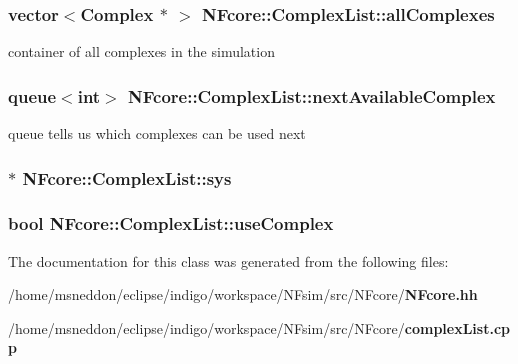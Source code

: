 \subsubsection{\setlength{\rightskip}{0pt plus 5cm}vector$<${\bf Complex} $\ast$ $>$ {\bf NFcore::ComplexList::allComplexes}\hspace{0.3cm}{\tt  [protected]}}\label{classNFcore_1_1ComplexList_146d4a4db088fb6c70c67e3c9dca62ae}


container of all complexes in the simulation 
\subsubsection{\setlength{\rightskip}{0pt plus 5cm}queue$<$int$>$ {\bf NFcore::ComplexList::nextAvailableComplex}\hspace{0.3cm}{\tt  [protected]}}\label{classNFcore_1_1ComplexList_981bea128eeea140b44ad1b28b50784a}


queue tells us which complexes can be used next 
\subsubsection{$\ast$ {\bf NFcore::ComplexList::sys}\hspace{0.3cm}{\tt  [protected]}}\label{classNFcore_1_1ComplexList_465b362ba62263c15c43973af283ccad}


\subsubsection{\setlength{\rightskip}{0pt plus 5cm}bool {\bf NFcore::ComplexList::useComplex}\hspace{0.3cm}{\tt  [protected]}}\label{classNFcore_1_1ComplexList_9392048fb2f9210ed5ee8161f667f467}




The documentation for this class was generated from the following files:\begin{CompactItemize}
\item 
/home/msneddon/eclipse/indigo/workspace/NFsim/src/NFcore/{\bf NFcore.hh}\item 
/home/msneddon/eclipse/indigo/workspace/NFsim/src/NFcore/{\bf complexList.cpp}\end{CompactItemize}
